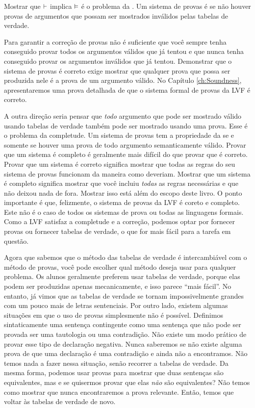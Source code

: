 Mostrar que $\vdash $ implica  $\vDash $  é  o problema da . \label{def:soundness} Um sistema de provas é   se não houver provas de argumentos que possam ser mostrados inválidos pelas tabelas de verdade. 
 \label{def_Soundness} 

Para garantir a correção de provas não é suficiente que você sempre tenha conseguido provar todos os argumentos válidos que já tentou e que nunca tenha conseguido provar os argumentos inválidos que já tentou. Demonstrar que o sistema de provas é correto exige mostrar que qualquer prova que possa ser produzida nele é a prova de um argumento válido.  No  Capítulo \ref{ch:Soundness}, apresentaremos uma prova detalhada de  que o sistema formal de provas da LVF é correto.  

A outra direção seria pensar que \emph{todo} argumento que pode ser mostrado válido usando tabelas de verdade também pode ser mostrado usando uma prova.
Esse é o problema da completude. Um sistema de provas tem a propriedade da    \label{def:completeness} se e somente se houver uma prova de todo argumento semanticamente válido. Provar que um sistema é completo é geralmente mais difícil do que provar que é correto. Provar que um sistema é correto significa mostrar que todas as regras do seu sistema de provas funcionam da maneira como deveriam.
Mostrar que um sistema é completo significa mostrar que você incluiu \emph{todas} as regras necessárias e que não deixou nada de fora. Mostrar isso está além do escopo deste livro. O ponto importante é que, felizmente, o sistema de provas da LVF é coreto e completo. Este não é o caso de todos os sistemas de prova ou todas as linguagens formais. Como a LVF satisfaz a completude e a correção,  podemos optar por fornecer provas ou fornecer tabelas de verdade, o que for mais fácil para a tarefa em questão.

Agora que sabemos que o método das tabelas de verdade é intercambiável com o método de provas, você pode escolher qual método deseja usar para qualquer problema. Os alunos geralmente preferem usar tabelas de verdade, porque elas podem ser produzidas apenas mecanicamente, e isso parece ``mais fácil''. No entanto, já vimos que as tabelas de verdade se tornam impossivelmente grandes com um pouco mais de letras sentenciais.
Por outro lado, existem algumas situações em que o uso de provas simplesmente não é possível. Definimos sintaticamente uma sentença contingente como uma sentença que não pode ser provada ser uma tautologia ou uma contradição. Não existe um modo prático de provar esse tipo de declaração negativa. Nunca saberemos se não existe alguma prova de que uma declaração é uma contradição e ainda não a encontramos. Não temos nada a fazer nessa situação, senão recorrer a tabelas de verdade. Da mesma forma, podemos usar provas para mostrar que duas sentenças são equivalentes, mas e se quisermos provar que elas \emph{não} são equivalentes? Não temos como mostrar que nunca encontraremos a prova relevante. Então, temos que voltar às tabelas de verdade de novo.

